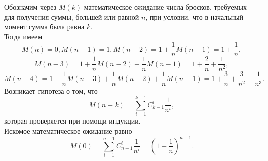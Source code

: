 \documentclass{article}
\begin{document}
Обозначим через $M(k)$ математическое ожидание числа бросков, требуемых для получения суммы, большей или равной $n$, при условии, что в начальный момент сумма была равна $k$.\\
Тогда имеем
$$M(n)=0, M(n-1)=1, M(n-2) = 1 + \frac{1}{n} M(n-1) = 1 + \frac{1}{n},$$
$$M(n-3) = 1 + \frac{1}{n} M(n-2) + \frac{1}{n} M(n-1) = 1 + \frac{2}{n} + \frac{1}{n^2},$$
$$M(n-4) = 1 + \frac{1}{n} M(n-3) + \frac{1}{n} M(n-2) + \frac{1}{n} M(n-1) = 1 + \frac{3}{n} + \frac{3}{n^2} + \frac{1}{n^3}.$$
Возникает гипотеза о том, что
$$M(n-k) = \sum_{i=1}^{k-1} C_{k-1}^i \frac{1}{n^i},$$
которая проверяется при помощи индукции.\\
Искомое математическое ожидание равно
$$M(0) = \sum_{i=1}^{n-1} C_{n-1}^i \frac{1}{n^i} = \left( 1 + \frac{1}{n} \right)^{n-1}.$$
\end{document}
